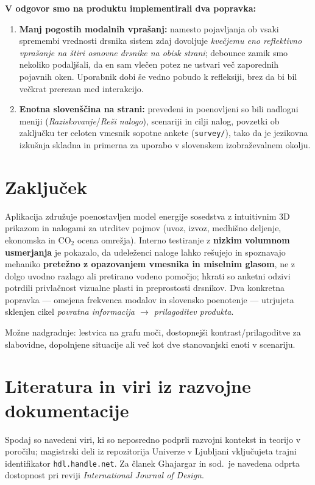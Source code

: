 \documentclass[a4paper,11pt]{article}
\begin{document}
\textbf{V odgovor smo na produktu implementirali dva popravka:}

\begin{enumerate}\itemsep=2pt
  \item \textbf{Manj pogostih modalnih vprašanj:} namesto pojavljanja ob vsaki spremembi vrednosti drsnika sistem zdaj dovoljuje \emph{kvečjemu eno reflektivno vprašanje na štiri osnovne drsnike na obisk strani}; debounce zamik smo nekoliko podaljšali, da en sam vlečen potez ne ustvari več zaporednih pojavnih oken. Uporabnik dobi še vedno pobudo k refleksiji, brez da bi bil večkrat prerezan med interakcijo.
  \item \textbf{Enotna slovenščina na strani:} prevedeni in poenovljeni so bili nadlogni meniji (\emph{Raziskovanje}/\emph{Reši nalogo}), scenariji in cilji nalog, povzetki ob zaključku ter celoten vmesnik sopotne ankete (\texttt{survey/}), tako da je jezikovna izkušnja skladna in primerna za uporabo v slovenskem izobraževalnem okolju.
\end{enumerate}

\section*{Zaključek}
Aplikacija združuje poenostavljen model energije sosedstva z intuitivnim 3D prikazom in nalogami za utrditev pojmov (uvoz, izvoz, medhišno deljenje, ekonomska in CO$_2$ ocena omrežja). Interno testiranje z \textbf{nizkim volumnom usmerjanja} je pokazalo, da udeleženci naloge lahko rešujejo in spoznavajo mehaniko \textbf{pretežno z opazovanjem vmesnika in miselnim glasom}, ne z dolgo uvodno razlago ali pretirano vodeno pomočjo; hkrati so anketni odzivi potrdili privlačnost vizualne plasti in preprostosti drsnikov. Dva konkretna popravka --- omejena frekvenca modalov in slovensko poenotenje --- utrjujeta sklenjen cikel \emph{povratna informacija $\rightarrow$ prilagoditev produkta}.

Možne nadgradnje: lestvica na grafu moči, dostopnejši kontrast/prilagoditve za slabovidne, dopolnjene situacije ali več kot dve stanovanjski enoti v scenariju.

\section*{Literatura in viri iz razvojne dokumentacije}
Spodaj so navedeni viri, ki so neposredno podprli razvojni kontekst in teorijo v poročilu; magistrski deli iz repozitorija Univerze v Ljubljani vključujeta trajni identifikator \texttt{hdl.handle.net}. Za članek Ghajargar in sod.\ je navedena odprta dostopnost pri reviji \textit{International Journal of Design}.
\end{document}
